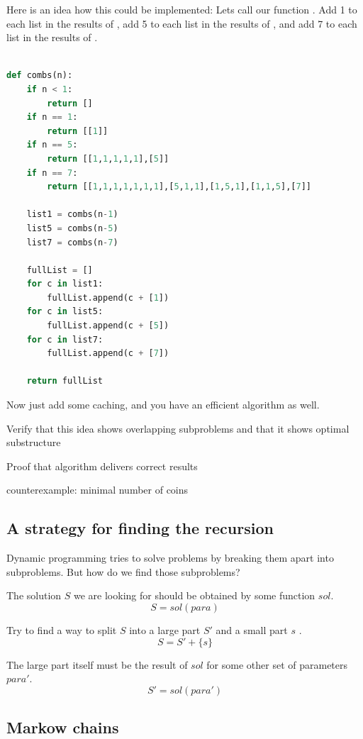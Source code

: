 Here is an idea how this could be implemented: 
Lets call our function .
Add 1 to each list in the results of ,
add 5 to each list in the results of , 
and add 7 to each list in the results of .


\begin{lstlisting}[language=python]

def combs(n):
	if n < 1:
		return []
	if n == 1:
		return [[1]]
	if n == 5:
		return [[1,1,1,1,1],[5]]
	if n == 7:
		return [[1,1,1,1,1,1,1],[5,1,1],[1,5,1],[1,1,5],[7]]

	list1 = combs(n-1)
	list5 = combs(n-5)
	list7 = combs(n-7)

	fullList = []
	for c in list1:
		fullList.append(c + [1])
	for c in list5:
		fullList.append(c + [5])
	for c in list7: 
		fullList.append(c + [7])

	return fullList

\end{lstlisting}

Now just add some caching, and you have an efficient algorithm as well. 

Verify that this idea shows overlapping subproblems
and that it shows optimal substructure

Proof that algorithm delivers correct results


counterexample: minimal number of coins


\subsection{A strategy for finding the recursion}

Dynamic programming tries to solve problems by breaking them apart into subproblems. But how do we find those subproblems?

The solution $S$ we are looking for should be obtained by some function $sol$.
$$ S = sol(para) $$

Try to find a way to split $S$ into a large part $S'$ and a small part $s$ .
$$ S = S' + \{ s \} $$

The large part itself must be the result of $sol$ for some other set of parameters $para'$.
$$ S' = sol(para') $$





\subsection{Markow chains}

